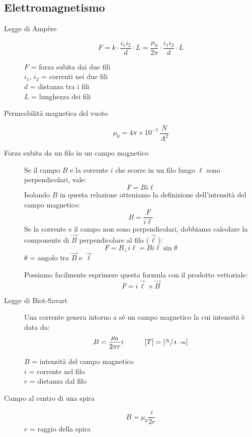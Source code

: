 \documentclass[a4paper,11pt,italian]{article}
\begin{document}
\subsection{Elettromagnetismo}

\begin{description}
  \item[Legge di Ampère]
  \[ F = k\cdot  \frac{i_1 i_2}{d}\cdot L = \frac{\mu_0}{2\pi} \cdot \frac{i_1 i_2}{d}\cdot L \]
  \begin{multicols}{2}
  $ F $ = forza subita dai due fili\\
  $ i_1 $, $ i_2 $ = correnti nei due fili\\
  $ d $ = distanza tra i fili\\
  $ L $ = lunghezza dei fili
  \end{multicols}
  
  \item[Permeabilità magnetica del vuoto]
  \[ \mu_0 = 4\pi \times 10^{-7} \, \frac{N}{A^2} \]
  
  \item[Forza subita da un filo in un campo magnetico] 
  Se il campo $ B $ e la corrente $ i $ che scorre in un filo lungo $ \ell $ sono perpendicolari, vale:\[ F = Bi\ell \]
  Isolando $ B $ in questa relazione otteniamo la definizione dell'intensità del campo magnetico:
  \[ B = \frac{F}{i\ell} \]
  Se la corrente e il campo non sono perpendicolari, dobbiamo calcolare la componente di $ \vec{B} $ perpendicolare al filo ($ \vec{\ell} $):
  \[ F = B_{\perp } i\ell = Bi\ell\sin\theta\]
  $ \theta $ = angolo tra $ \vec{B} $ e $ \vec{\ell} $
  
  Possiamo facilmente esprimere questa formula con il prodotto vettoriale:
  \[ F = i \vec{\ell} \times \vec{B} \]
  
  \item[Legge di Biot-Savart] 
  Una corrente genera intorno a sé un campo magnetico la cui intensità è data da:
  \[ B = \frac{\mu_0}{2\pi r} i \hspace*{3em} [T] = \left[ \sfrac{N}{A\cdot m} \right] \]
  \begin{multicols}{2}
  $ B $ = intensità del campo magnetico\\
  $ i $ = corrente nel filo\\
  $ r $ = distanza dal filo
  \end{multicols}  

  \item[Campo al centro di una spira]
  \[ B = \mu_0 \frac{i}{2r} \]
  $ r $ = raggio della spira
  

\end{description}
\end{document}
